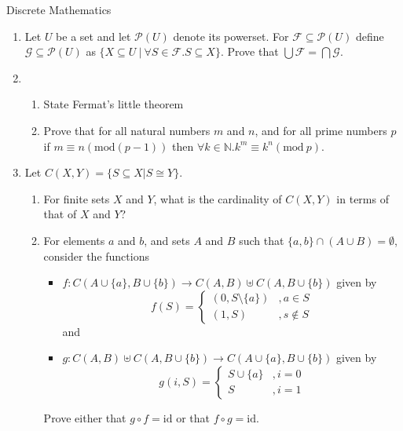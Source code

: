 \documentclass{tripos}
\begin{document}
\begin{question}[MockIA,year=2025,paper=1,question=5,author=nobody]{Discrete Mathematics}

\begin{enumerate}
  \item Let $U$ be a set and let ${\mathcal P}(U)$ denote its powerset.
For ${\mathcal F} \subseteq {\mathcal P}(U)$ define ${\mathcal G} \subseteq {\mathcal P}(U)$ as $\{ X \subseteq U\ |\ \forall S \in {\mathcal F}. S \subseteq X\}$.
Prove that $\bigcup {\mathcal F} = \bigcap {\mathcal G}$. 
\item
  \begin{enumerate}
  \item State Fermat's little theorem 
  \item Prove that for all natural numbers $m$ and $n$, and for all prime numbers $p$ if $m \equiv n (\mbox{mod}(p-1))$ then $\forall k \in \mathbb{N}. k^m \equiv k^n (\mbox{mod}\ p)$.
  \end{enumerate}

\item Let $C(X,Y) = \{ S \subseteq X | S \cong Y \}$.
  \begin{enumerate}
  \item For finite sets $X$ and $Y$, what is the cardinality of $C(X,Y)$ in terms of that of $X$ and $Y$?
  \item For elements $a$ and $b$, and sets $A$ and $B$ such that $\{a,b\} \cap (A \cup B) = \emptyset$, consider the functions
    \begin{itemize}
    \item $f: C(A \cup \{a\}, B \cup \{b\}) \rightarrow C(A,B) \uplus C(A,B \cup \{b\})$ given by
      \[
      f(S) = \begin{cases}
        (0,S \setminus \{a\}) & , a \in S \\
        (1,S) & , s \notin S
          \end{cases}
      \]
      and
    \item
      $g : C(A,B) \uplus C(A,B \cup \{b\}) \rightarrow C(A \cup \{a\}, B \cup \{b\})$ given by
      \[
      g(i,S) = \begin{cases}
        S \cup \{a\} &, i = 0 \\
        S &, i = 1
      \end{cases}
      \]
    \end{itemize}

    Prove either that $g \circ f = \mbox{id}$ or that $f \circ g = \mbox{id}$.
    \end{enumerate}
  
\end{enumerate}

\end{question}
\end{document}
